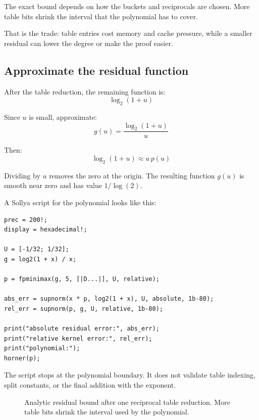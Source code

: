 \documentclass[manuscript, nonacm]{acmart}
\begin{document}
  The exact bound depends on how the buckets and reciprocals are chosen. More
  table bits shrink the interval that the polynomial has to cover.

  That is the trade: table entries cost memory and cache pressure, while a
  smaller residual can lower the degree or make the proof easier.

  \subsection{Approximate the residual function}

  After the table reduction, the remaining function is:
  \[ \log_2(1 + u) \]

  Since $u$ is small, approximate:
  \[ g(u) = \frac{\log_2(1 + u)}{u} \]

  Then:
  \[ \log_2(1 + u) \approx u\,p(u) \]

  Dividing by $u$ removes the zero at the origin. The resulting function
  $g(u)$ is smooth near zero and has value $1/\log(2)$.

  A Sollya script for the polynomial looks like this:
  \begin{lstlisting}[style=sollya]
prec = 200!;
display = hexadecimal!;

U = [-1/32; 1/32];
g = log2(1 + x) / x;

p = fpminimax(g, 5, [|D...|], U, relative);

abs_err = supnorm(x * p, log2(1 + x), U, absolute, 1b-80);
rel_err = supnorm(p, g, U, relative, 1b-80);

print("absolute residual error:", abs_err);
print("relative kernel error:", rel_err);
print("polynomial:");
horner(p);
  \end{lstlisting}

  The script stops at the polynomial boundary. It does not validate
  table indexing, split constants, or the final addition with the exponent.

  \begin{figure}[tbp]
    \centering
    \caption{Analytic residual bound after one reciprocal table reduction.
    More table bits shrink the interval used by the polynomial.}
  \end{figure}
\end{document}
